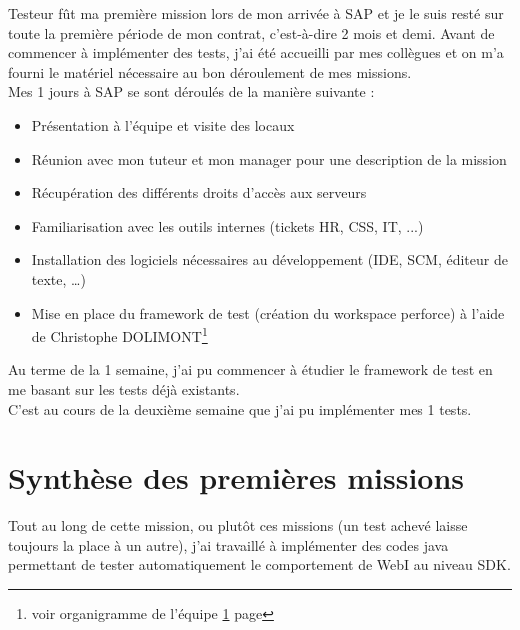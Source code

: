 Testeur fût ma premi\`{e}re mission lors de mon arriv\'{e}e \`{a} SAP et je le suis rest\'{e} sur toute la premi\`{e}re p\'{e}riode de mon contrat, c'est-\`{a}-dire 2 mois et demi. Avant de commencer \`{a} impl\'{e}menter des tests, j'ai \'{e}t\'{e} accueilli par mes coll\`{e}gues et on m'a fourni le mat\'{e}riel n\'{e}cessaire au bon d\'{e}roulement de mes missions.\\
Mes 1 jours \`{a} SAP se sont d\'{e}roul\'{e}s de la mani\`{e}re suivante :\\
\begin{itemize}
\item Pr\'{e}sentation \`{a} l'\'{e}quipe et visite des locaux
\item R\'{e}union avec mon tuteur et mon manager pour une description de la mission
\item R\'{e}cup\'{e}ration des diff\'{e}rents droits d'acc\`{e}s aux serveurs
\item Familiarisation avec les outils internes (tickets HR, CSS, IT, ...)
\item Installation des logiciels n\'{e}cessaires au d\'{e}veloppement (IDE, SCM, \'{e}diteur de texte, \ldots)
\item Mise en place du framework de test (cr\'{e}ation du workspace perforce) \`{a} l'aide de Christophe DOLIMONT\footnote{voir organigramme de l'équipe \ref{} page \pageref{} }
\end{itemize}
Au terme de la 1 semaine, j'ai pu commencer \`{a} \'{e}tudier le framework de test en me basant sur les tests d\'{e}j\`{a} existants.\\
C'est au cours de la deuxi\`{e}me semaine que j'ai pu impl\'{e}menter mes 1 tests.




\section{Synth\`{e}se des premières missions}

Tout au long de cette mission, ou plutôt ces missions (un test achev\'{e} laisse toujours la place \`{a} un autre), j'ai travaill\'{e} \`{a} impl\'{e}menter des codes java permettant de tester automatiquement le comportement de WebI au niveau SDK.

